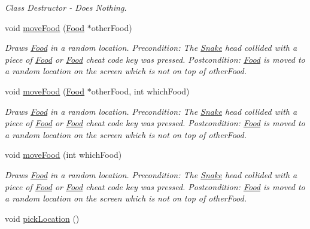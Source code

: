 \begin{DoxyCompactItemize}
\begin{DoxyCompactList}\small\item\em \-Class \-Destructor -\/ \-Does \-Nothing. \end{DoxyCompactList}\item 
void \hyperlink{classFood_ad902c4b35177dc47f4f5845cea946b47}{move\-Food} (\hyperlink{classFood}{\-Food} $\ast$other\-Food)
\begin{DoxyCompactList}\small\item\em \-Draws \hyperlink{classFood}{\-Food} in a random location. \-Precondition\-: \-The \hyperlink{classSnake}{\-Snake} head collided with a piece of \hyperlink{classFood}{\-Food} or \hyperlink{classFood}{\-Food} cheat code key was pressed. \-Postcondition\-: \hyperlink{classFood}{\-Food} is moved to a random location on the screen which is not on top of other\-Food. \end{DoxyCompactList}\item 
void \hyperlink{classFood_abb8f6f4e6de3a9c30d821a570227b0b3}{move\-Food} (\hyperlink{classFood}{\-Food} $\ast$other\-Food, int which\-Food)
\begin{DoxyCompactList}\small\item\em \-Draws \hyperlink{classFood}{\-Food} in a random location. \-Precondition\-: \-The \hyperlink{classSnake}{\-Snake} head collided with a piece of \hyperlink{classFood}{\-Food} or \hyperlink{classFood}{\-Food} cheat code key was pressed. \-Postcondition\-: \hyperlink{classFood}{\-Food} is moved to a random location on the screen which is not on top of other\-Food. \end{DoxyCompactList}\item 
void \hyperlink{classFood_a3eb6229d350b6d6dec7256f633c0e603}{move\-Food} (int which\-Food)
\begin{DoxyCompactList}\small\item\em \-Draws \hyperlink{classFood}{\-Food} in a random location. \-Precondition\-: \-The \hyperlink{classSnake}{\-Snake} head collided with a piece of \hyperlink{classFood}{\-Food} or \hyperlink{classFood}{\-Food} cheat code key was pressed. \-Postcondition\-: \hyperlink{classFood}{\-Food} is moved to a random location on the screen which is not on top of other\-Food. \end{DoxyCompactList}\item 
\hypertarget{classFood_a7a286e4848f36fd65ba15d83cf09712d}{void \hyperlink{classFood_a7a286e4848f36fd65ba15d83cf09712d}{pick\-Location} ()}\label{classFood_a7a286e4848f36fd65ba15d83cf09712d}


\end{DoxyCompactItemize}
